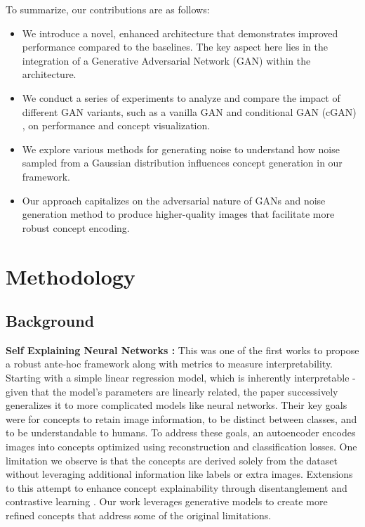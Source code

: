 \documentclass[letterpaper]{article}
\begin{document}
To summarize, our contributions are as follows:
\begin{itemize}
    \item We introduce a novel, enhanced architecture that demonstrates improved performance compared to the baselines. The key aspect here lies in the integration of a Generative Adversarial Network (GAN) \cite{GAN} within the architecture.
    \item We conduct a series of experiments to analyze and compare the impact of different GAN variants, such as a vanilla GAN \cite{GAN} and conditional GAN (cGAN) \cite{CGAN}, on performance and concept visualization.
    \item We explore various methods for generating noise to understand how noise sampled from a Gaussian distribution influences concept generation in our framework.
    \item Our approach capitalizes on the adversarial nature of GANs and noise generation method to produce higher-quality images that facilitate more robust concept encoding.
\end{itemize}

\section{Methodology}\label{sec:method}
\subsection{Background}\label{sec:background}


\textbf{Self Explaining Neural Networks \cite{SENN}:} This was one of the first works to propose a robust ante-hoc framework along with metrics to measure interpretability. Starting with a simple linear regression model, which is inherently interpretable - given that the model's parameters are linearly related, the paper successively generalizes it to more complicated models like neural networks. Their key goals were for concepts to retain image information, to be distinct between classes, and to be  understandable to humans. To address these goals, an autoencoder encodes images into concepts optimized using reconstruction and classification losses. One limitation we observe is that the concepts are derived solely from the dataset without leveraging additional information like labels or extra images. Extensions to this attempt to enhance concept explainability through disentanglement and contrastive learning \cite{CSENN}. Our work leverages generative models to create more refined concepts that address some of the original limitations.
\end{document}
